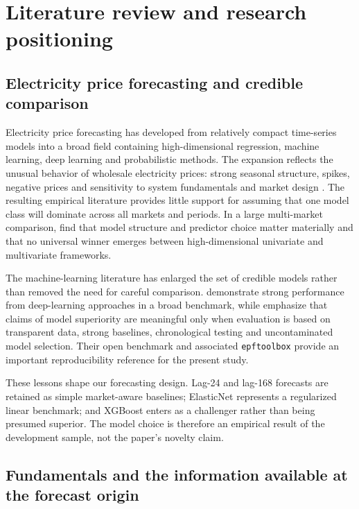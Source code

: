 \section{Literature review and research positioning}
\label{sec:literature}

\subsection{Electricity price forecasting and credible comparison}

Electricity price forecasting has developed from relatively compact time-series models into a broad field containing high-dimensional regression, machine learning, deep learning and probabilistic methods. The expansion reflects the unusual behavior of wholesale electricity prices: strong seasonal structure, spikes, negative prices and sensitivity to system fundamentals and market design \citep{weron2014}. The resulting empirical literature provides little support for assuming that one model class will dominate across all markets and periods. In a large multi-market comparison, \citet{zielweron2018} find that model structure and predictor choice matter materially and that no universal winner emerges between high-dimensional univariate and multivariate frameworks.

The machine-learning literature has enlarged the set of credible models rather than removed the need for careful comparison. \citet{lagodeep2018} demonstrate strong performance from deep-learning approaches in a broad benchmark, while \citet{lago2021} emphasize that claims of model superiority are meaningful only when evaluation is based on transparent data, strong baselines, chronological testing and uncontaminated model selection. Their open benchmark and associated \texttt{epftoolbox} provide an important reproducibility reference for the present study.

These lessons shape our forecasting design. Lag-24 and lag-168 forecasts are retained as simple market-aware baselines; ElasticNet represents a regularized linear benchmark; and XGBoost enters as a challenger rather than being presumed superior. The model choice is therefore an empirical result of the development sample, not the paper's novelty claim.

\subsection{Fundamentals and the information available at the forecast origin}

